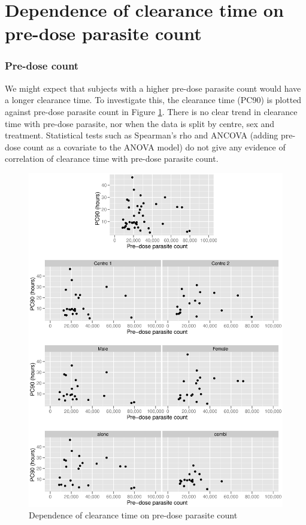 \section{Dependence of clearance time on pre-dose parasite count}
\subsubsection*{Pre-dose count}
We might expect that subjects with a higher pre-dose parasite count would have a longer clearance time. To investigate this, the clearance time (PC90) is plotted against pre-dose parasite count in Figure \ref{predose-ancova}. There is no clear trend in clearance time with pre-dose parasite, nor when the data is split by centre, sex and treatment. Statistical tests such as Spearman's rho and ANCOVA (adding pre-dose count as a covariate to the ANOVA model) do not give any evidence of correlation of clearance time with pre-dose parasite count.
\begin{figure}[h]
\includegraphics[width=150mm]{predose-ancova.eps} 
\caption{Dependence of clearance time on pre-dose parasite count}
\label{predose-ancova}
\end{figure}

